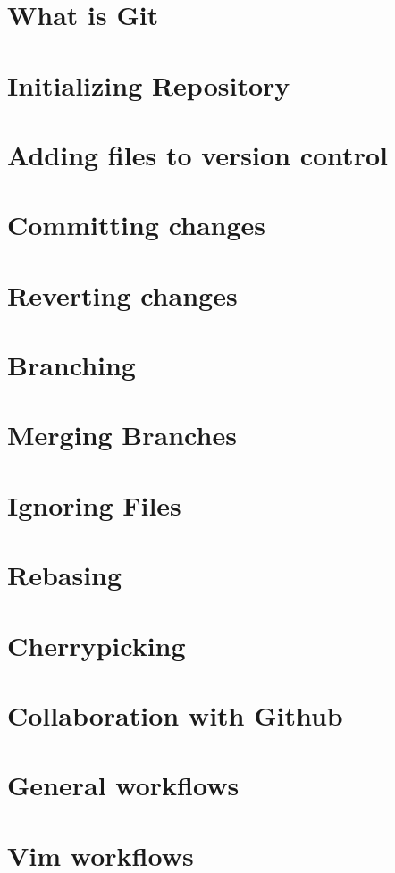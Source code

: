 \documentclass{amsart}
\begin{document}
\newpage

\section*{What is Git}

\newpage

\section*{Initializing Repository}

\newpage

\section*{Adding files to version control}

\newpage

\section*{Committing changes}

\newpage

\section*{Reverting changes}

\newpage

\section*{Branching}

\newpage

\section*{Merging Branches}

\newpage

\section*{Ignoring Files}

\newpage

\section*{Rebasing}

\newpage

\section*{Cherrypicking}

\newpage

\section*{Collaboration with Github}

\newpage

\section*{General workflows}

\newpage

\section*{Vim workflows}
\end{document}
